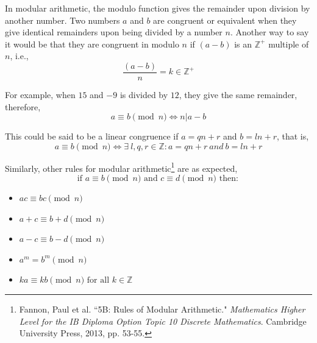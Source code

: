 \documentclass[a4paper,12pt]{article}
\theoremstyle{definition}
\begin{document}
In modular arithmetic, the modulo function gives the remainder upon division by another number. Two numbers $a$ and $b$ are congruent or equivalent when they give identical remainders upon being divided by a number $n$. Another way to say it would be that they are congruent in modulo $n$ if $(a-b)$ is an $\mathbb{Z^+}$ multiple of $n$, i.e.,
\begin{equation*}
    \frac{(a-b)}{n} = k \in \mathbb{Z^+}
\end{equation*}

For example, when $15$ and $-9$ is divided by $12$, they give the same remainder, therefore,
\begin{equation}
	a \equiv b \pmod{n} \iff n|a-b
\end{equation} 

This could be said to be a linear congruence if $a=qn+r$ and $b=ln+r$, that is,
\begin{equation}
	a \equiv b \pmod{n} \iff \exists\ l,q,r \in \mathbb{Z}: a = qn + r\ and\ b = ln + r
\end{equation}

Similarly, other rules for modular arithmetic\footnote{Fannon, Paul et al. ``5B: Rules of Modular Arithmetic." \textit{Mathematics Higher Level for the IB Diploma Option Topic 10 Discrete Mathematics}. Cambridge University Press, 2013, pp. 53-55.} are as expected,
\begin{equation*}
    \text{if } a \equiv b \pmod n \text{ and } c \equiv d \pmod n \text{ then}:
\end{equation*}

\begin{itemize}
	\item $ac \equiv bc \pmod n$
	\item $a+c \equiv b+d \pmod n$
	\item $a-c \equiv b-d \pmod n$
	\item $a^m = b^m \pmod n$
	\item $ka \equiv kb \pmod n \mbox{ for all } k\in \mathbb{Z}$
\end{itemize}
\end{document}
